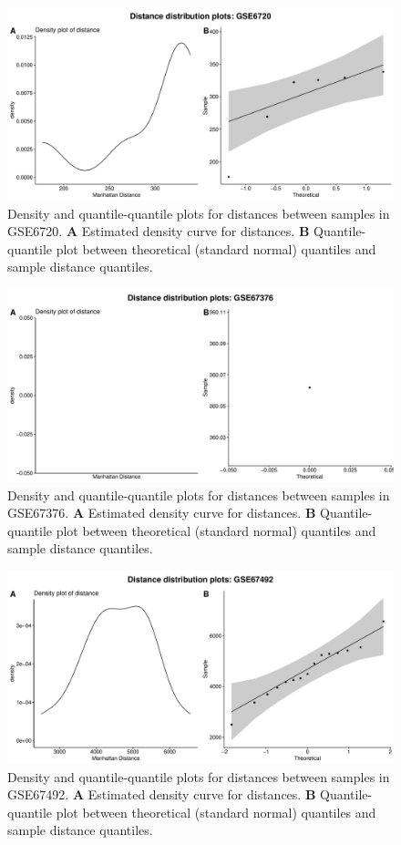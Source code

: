 \documentclass[10pt,letterpaper]{article}\usepackage[]{graphicx}\usepackage[]{color}
\begin{document}
\begin{figure}[H]
	\includegraphics[width=\textwidth]{manhattan-distance_hist_GSE6720.pdf}
	\caption{Density and quantile-quantile plots for distances between samples in GSE6720. \textbf{A} Estimated density curve for distances. \textbf{B} Quantile-quantile plot between theoretical (standard normal) quantiles and sample distance quantiles.}
\end{figure}

\begin{figure}[H]
	\includegraphics[width=\textwidth]{manhattan-distance_hist_GSE67376.pdf}
	\caption{Density and quantile-quantile plots for distances between samples in GSE67376. \textbf{A} Estimated density curve for distances. \textbf{B} Quantile-quantile plot between theoretical (standard normal) quantiles and sample distance quantiles.}
\end{figure}

\begin{figure}[H]
	\includegraphics[width=\textwidth]{manhattan-distance_hist_GSE67492.pdf}
	\caption{Density and quantile-quantile plots for distances between samples in GSE67492. \textbf{A} Estimated density curve for distances. \textbf{B} Quantile-quantile plot between theoretical (standard normal) quantiles and sample distance quantiles.}
\end{figure}
\end{document}
